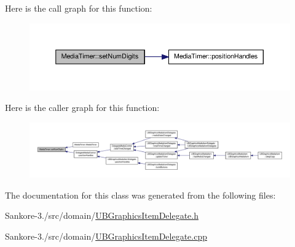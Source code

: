 Here is the call graph for this function\-:
\nopagebreak
\begin{figure}[H]
\begin{center}
\leavevmode
\includegraphics[width=350pt]{db/dc2/class_media_timer_a2cbb7719237a850fd7a49ea68c24a343_cgraph}
\end{center}
\end{figure}




Here is the caller graph for this function\-:
\nopagebreak
\begin{figure}[H]
\begin{center}
\leavevmode
\includegraphics[width=350pt]{db/dc2/class_media_timer_a2cbb7719237a850fd7a49ea68c24a343_icgraph}
\end{center}
\end{figure}




The documentation for this class was generated from the following files\-:\begin{DoxyCompactItemize}
\item 
Sankore-\/3./src/domain/\hyperlink{_u_b_graphics_item_delegate_8h}{U\-B\-Graphics\-Item\-Delegate.\-h}\item 
Sankore-\/3./src/domain/\hyperlink{_u_b_graphics_item_delegate_8cpp}{U\-B\-Graphics\-Item\-Delegate.\-cpp}\end{DoxyCompactItemize}
